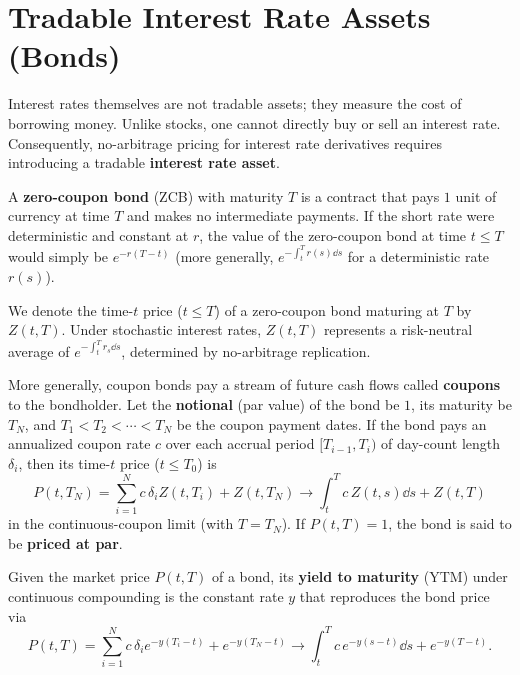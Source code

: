 \section{Tradable Interest Rate Assets (Bonds)}

Interest rates themselves are not tradable assets; they measure the cost of borrowing money. Unlike stocks, one cannot directly buy or sell an interest rate. Consequently, no-arbitrage pricing for interest rate derivatives requires introducing a tradable \textbf{interest rate asset}.

\begin{definition}\label{def:zcb}
    A \textbf{zero-coupon bond} (ZCB) with maturity $T$ is a contract that pays $1$ unit of currency at time $T$ and makes no intermediate payments. If the short rate were deterministic and constant at $r$, the value of the zero-coupon bond at time $t \leq T$ would simply be $e^{-r(T-t)}$ (more generally, $e^{-\int_t^T r(s)\dd s}$ for a deterministic rate $r(s)$).
\end{definition}

We denote the time-$t$ price ($t \leq T$) of a zero-coupon bond maturing at $T$ by $Z(t, T)$. Under stochastic interest rates, $Z(t, T)$ represents a risk-neutral average of $e^{-\int_t^T r_s\dd s}$, determined by no-arbitrage replication.

More generally, coupon bonds pay a stream of future cash flows called \textbf{coupons} to the bondholder. Let the \textbf{notional} (par value) of the bond be $1$, its maturity be $T_N$, and $T_1 < T_2 < \cdots < T_N$ be the coupon payment dates. If the bond pays an annualized coupon rate $c$ over each accrual period $[T_{i-1}, T_i)$ of day-count length $\delta_i$, then its time-$t$ price ($t \leq T_0$) is
\[
P(t, T_N) = \sum_{i=1}^N c\,\delta_i Z(t, T_i) + Z(t, T_N) \longrightarrow \int_t^T c\,Z(t, s)\dd s + Z(t, T)
\]
in the continuous-coupon limit (with $T = T_N$). If $P(t, T) = 1$, the bond is said to be \textbf{priced at par}.

\begin{definition}\label{def:ytm}
    Given the market price $P(t, T)$ of a bond, its \textbf{yield to maturity} (YTM) under continuous compounding is the constant rate $y$ that reproduces the bond price via
    \[
    P(t, T) = \sum_{i=1}^N c\,\delta_i e^{-y(T_i - t)} + e^{-y(T_N - t)} \longrightarrow \int_t^T c\,e^{-y(s - t)}\dd s + e^{-y(T - t)}.
    \]
\end{definition}

